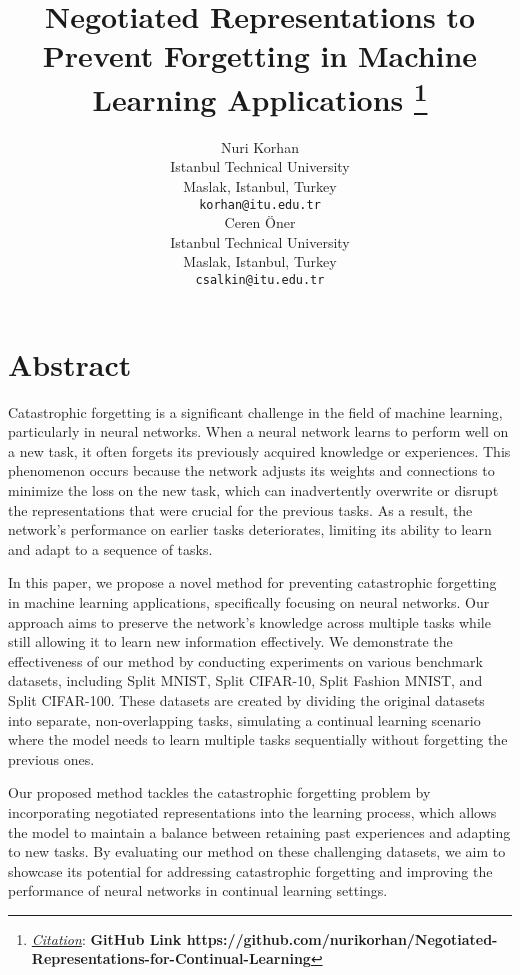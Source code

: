 \documentclass{article}
\title{Negotiated Representations to Prevent Forgetting in Machine Learning Applications 
\thanks{\textit{\underline{Citation}}: 
\textbf{GitHub Link https://github.com/nurikorhan/Negotiated-Representations-for-Continual-Learning}} 
}
\author{
  Nuri Korhan \\
  Istanbul Technical University  \\
  Maslak, Istanbul, Turkey \\
  \texttt{korhan@itu.edu.tr} \\
  \And
  Ceren Öner \\
   Istanbul Technical University \\
  Maslak, Istanbul, Turkey\\
  \texttt{csalkin@itu.edu.tr} \\
}
\begin{document}
\maketitle

\section{Abstract}
Catastrophic forgetting is a significant challenge in the field of machine learning, particularly in neural networks. When a neural network learns to perform well on a new task, it often forgets its previously acquired knowledge or experiences. This phenomenon occurs because the network adjusts its weights and connections to minimize the loss on the new task, which can inadvertently overwrite or disrupt the representations that were crucial for the previous tasks. As a result, the network's performance on earlier tasks deteriorates, limiting its ability to learn and adapt to a sequence of tasks.

In this paper, we propose a novel method for preventing catastrophic forgetting in machine learning applications, specifically focusing on neural networks. Our approach aims to preserve the network's knowledge across multiple tasks while still allowing it to learn new information effectively. We demonstrate the effectiveness of our method by conducting experiments on various benchmark datasets, including Split MNIST, Split CIFAR-10, Split Fashion MNIST, and Split CIFAR-100. These datasets are created by dividing the original datasets into separate, non-overlapping tasks, simulating a continual learning scenario where the model needs to learn multiple tasks sequentially without forgetting the previous ones.

Our proposed method tackles the catastrophic forgetting problem by incorporating negotiated representations into the learning process, which allows the model to maintain a balance between retaining past experiences and adapting to new tasks. By evaluating our method on these challenging datasets, we aim to showcase its potential for addressing catastrophic forgetting and improving the performance of neural networks in continual learning settings.
\end{document}
